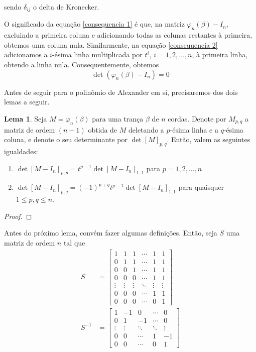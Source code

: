 \documentclass[a4paper,portuguese,11pt,twoside, leqno]{book}
\theoremstyle{definition}
\newtheorem{lemma}[theorem]{Lema}
\begin{document}
	\par sendo $\delta_{ij}$ o delta de Kronecker.
	\par\vspace{0.3cm} O significado da equação \eqref{consequencia 1} é que, na matriz $\varphi_n(\beta) - I_n$, excluindo a primeira coluna e adicionando todas as colunas restantes à primeira, obtemos uma coluna nula. Similarmente, na equação \eqref{consequencia 2} adicionamos a $i$-ésima linha multiplicada por $t^i$, $i=1,2,\dots,n$, à primeira linha, obtendo a linha nula. Consequentemente, obtemos
	\begin{equation*}
	\det(\varphi_n(\beta) - I_n) = 0
	\end{equation*}
	\par\vspace{0.3cm} Antes de seguir para o polinômio de Alexander em si, precisaremos dos dois lemas a seguir.
	\begin{lemma}
		\label{exercicio}
		Seja $M = \varphi_n(\beta)$ para uma trança $\beta$ de $n$ cordas. Denote por $M_{p,q}$ a matriz de ordem $(n-1)$ obtida de $M$ deletando a $p$-ésima linha e a $q$-ésima coluna, e denote o seu determinante por $\det[M]_{p,q}$. Então, valem as seguintes igualdades:
		\begin{enumerate}
			\item $\det[M - I_n]_{p,p} = t^{p-1}\det[M - I_n]_{1,1}$ para $p=1,2,\dots,n$
			\item $\det[M - I_n]_{p,q} = (-1)^{p+q}t^{p-1}\det[M - I_n]_{1,1}$ para quaisquer $1\leq p,q\leq n$.
		\end{enumerate}
	\end{lemma}
	\begin{proof}
		
	\end{proof}
	\par\vspace{0.3cm} Antes do próximo lema, convém fazer algumas definições. Então, seja $S$ uma matriz de ordem $n$ tal que
	\begin{align*}
	S &= \begin{bmatrix}
	1 & 1 & 1 & \cdots & 1 & 1 \\
	0 & 1 & 1 & \cdots & 1 & 1 \\
	0 & 0 & 1 & \cdots & 1 & 1 \\
	0 & 0 & 0 & \cdots & 1 & 1 \\
	\vdots & \vdots & \vdots & \ddots & \vdots & \vdots \\
	0 & 0 & 0 & \cdots & 1 & 1 \\
	0 & 0 & 0 & \cdots & 0 & 1
	\end{bmatrix}\\
	S^{-1} &= \begin{bmatrix}
	1 & -1 & 0 & \cdots & 0\\
	0 & 1  & -1 & \cdots & 0\\
	\vdots & \vdots & \ddots & \ddots & \vdots \\
	0 & 0 & \cdots & 1 & -1 \\
	0 & 0 & \cdots & 0 & 1
	\end{bmatrix}
	\end{align*}
\end{document}
